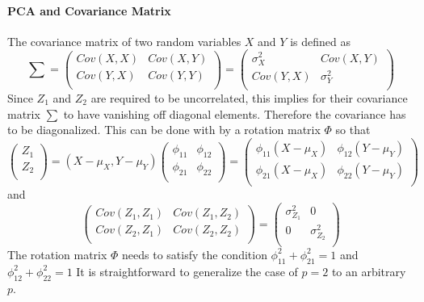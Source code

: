 {	\paragraph{PCA and Covariance Matrix}
	{The covariance matrix of two random variables $X$ and $Y$ is defined as 
		$$\sum = 
		\begin{pmatrix}
		Cov(X,X) & Cov(X,Y) \\
		Cov(Y,X) & Cov(Y,Y) \\
		\end{pmatrix}
		=
		\begin{pmatrix}
		\sigma_X^2 & Cov(X,Y) \\
		Cov(Y,X) & \sigma_Y^2 \\
		\end{pmatrix}
	 $$	
	Since $Z_1$ and $Z_2$ are required to be uncorrelated, this implies for their covariance matrix $\sum$ to have vanishing off diagonal elements. Therefore the covariance has to be diagonalized. This can be done with by a rotation matrix $\Phi$ so that
	$$ 
	\begin{pmatrix}
	Z_1\\
	Z_2\\
	\end{pmatrix}
	 = (X-\mu_X,Y-\mu_Y)
	 \begin{pmatrix}
	 \phi_{11}&\phi_{12}\\
	 \phi_{21}&\phi_{22}\\
	 \end{pmatrix}
	 =
	 \begin{pmatrix}
	 \phi_{11}(X-\mu_X)&\phi_{12}(Y-\mu_Y)\\
	 \phi_{21}(X-\mu_X)&\phi_{22}(Y-\mu_Y)\\
	 \end{pmatrix}
	 $$
	 and
	 $$
	 \begin{pmatrix}
	 Cov(Z_1,Z_1)&Cov(Z_1,Z_2)\\
	 Cov(Z_2,Z_1)&Cov(Z_2,Z_2)\\
	 \end{pmatrix}
	 =
	 \begin{pmatrix}
	 	\sigma_{Z_1}^2&0\\
	 	0&\sigma_{Z_2}^2\\
	 \end{pmatrix}
	 $$
	 The rotation matrix $\Phi$ needs to satisfy the condition $\phi_{11}^2+ \phi_{21}^2=1$ and $\phi_{12}^2+\phi_{22}^2=1$
	 It is straightforward to generalize the case of $p=2$ to an arbitrary $p$. 
	}
}
